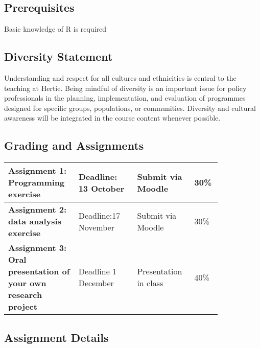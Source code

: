 \documentclass[
]{article}
\begin{document}
\hypertarget{prerequisites}{%
\subsection{Prerequisites}\label{prerequisites}}

Basic knowledge of R is required

\hypertarget{diversity-statement}{%
\subsection{Diversity Statement}\label{diversity-statement}}

Understanding and respect for all cultures and ethnicities is central to
the teaching at Hertie. Being mindful of diversity is an important issue
for policy professionals in the planning, implementation, and evaluation
of programmes designed for specific groups, populations, or communities.
Diversity and cultural awareness will be integrated in the course
content whenever possible.

\hypertarget{grading-and-assignments}{%
\subsection{Grading and Assignments}\label{grading-and-assignments}}

\begin{tabular}{p{0.28\linewidth}p{0.25\linewidth}p{0.2\linewidth}p{0.1\linewidth}}

\toprule[1pt]

\textbf{Assignment 1: Programming exercise} & Deadline: 13 October & Submit via Moodle & 30\% \\
\midrule[0.5pt]
\textbf{Assignment 2: data analysis exercise} & Deadline:17  November & Submit via Moodle & 30\% \\

\midrule[0.5pt]

\textbf{Assignment 3: Oral presentation of your own research project} & Deadline 1 December & Presentation in class & 40\% \\
\bottomrule[0.5pt]


\end{tabular}

\hypertarget{assignment-details}{%
\subsection{Assignment Details}\label{assignment-details}}
\end{document}
